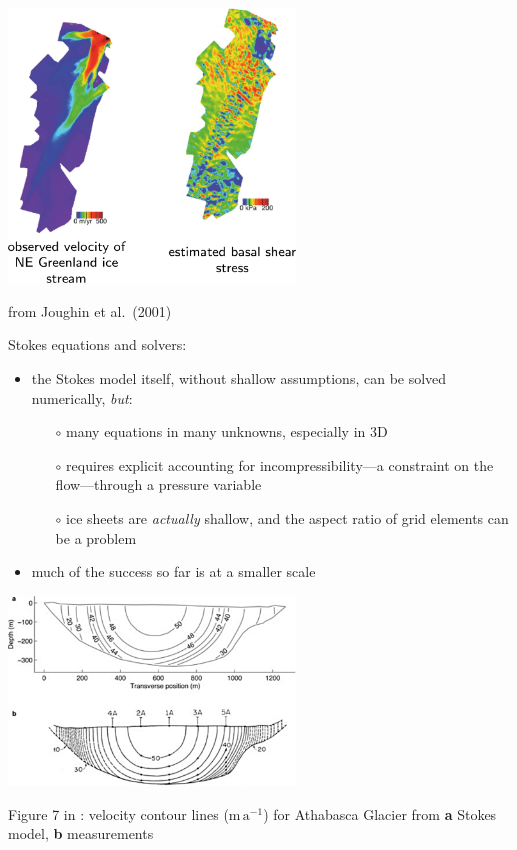 \documentclass[titlepage,letterpaper,final,11pt]{scrartcl}
\newcommand{\alert}[1]{\emph{#1}}
\begin{document}
\begin{center}
  \includegraphics[width=3.0in]{NEgreenlandJoughin}
  
from Joughin et al.~(2001)\nocite{Joughinetal2001}
\end{center}

Stokes equations and solvers:

\begin{itemize}
\item the Stokes model itself, without shallow assumptions, can be solved numerically, \alert{but}:
  \begin{itemize}
  \item[$\circ$] many equations in many unknowns, especially in 3D
  \item[$\circ$] requires explicit accounting for incompressibility---a constraint on the flow---through a pressure variable
  \item[$\circ$] ice sheets are \emph{actually} shallow, and the aspect ratio of grid elements can be a problem
  \end{itemize}
\item much of the success so far is at a smaller scale
\end{itemize}

\begin{center}
\includegraphics[width=3.0in]{athabasca}

Figure 7 in \cite{Maxwelletal2008}:  velocity contour lines ($\text{m}\,\text{a}^{-1}$) for Athabasca Glacier from \textbf{a} Stokes model, \textbf{b} measurements \cite{Raymond1971}
\end{center}
\end{document}
